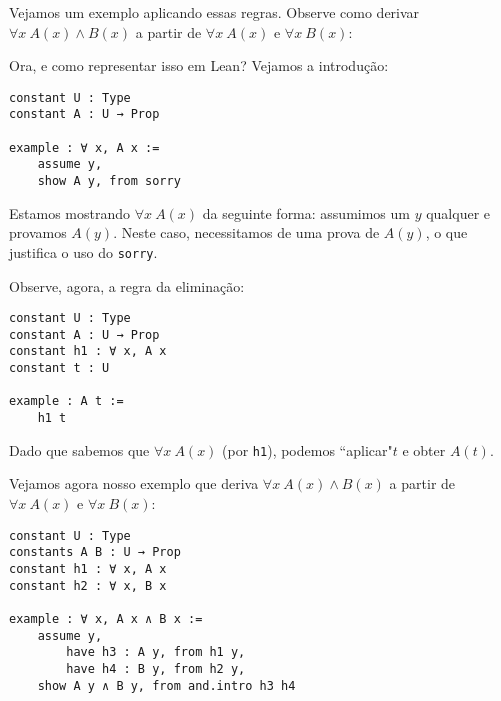         Vejamos um exemplo aplicando essas regras. Observe como derivar $\forall x \ A(x) \land B(x)$ a partir de $\forall x \ A(x)$ e $\forall x \ B(x)$:

        \begin{center}
            \begin{bprooftree}
            \end{bprooftree}
        \end{center}

        Ora, e como representar isso em Lean? Vejamos a introdução:

        \begin{lstlisting}
constant U : Type
constant A : U → Prop

example : ∀ x, A x :=
    assume y,
    show A y, from sorry
\end{lstlisting}

        Estamos mostrando $\forall x \ A(x)$ da seguinte forma: assumimos um $y$ qualquer e provamos $A(y)$.
Neste caso, necessitamos de uma prova de $A(y)$, o que justifica o uso do \lstinline{sorry}.

        Observe, agora, a regra da eliminação:

        \begin{lstlisting}
constant U : Type
constant A : U → Prop
constant h1 : ∀ x, A x
constant t : U

example : A t :=
    h1 t
\end{lstlisting}

        Dado que sabemos que $\forall x \ A(x)$ (por \lstinline{h1}), podemos ``aplicar"\space $t$ e obter $A(t)$.

        Vejamos agora nosso exemplo que deriva $\forall x \ A(x) \land B(x)$ a partir de $\forall x \ A(x)$ e $\forall x \ B(x)$:

        \begin{lstlisting}
constant U : Type
constants A B : U → Prop
constant h1 : ∀ x, A x
constant h2 : ∀ x, B x

example : ∀ x, A x ∧ B x :=
    assume y,
        have h3 : A y, from h1 y,
        have h4 : B y, from h2 y,
    show A y ∧ B y, from and.intro h3 h4
\end{lstlisting}

